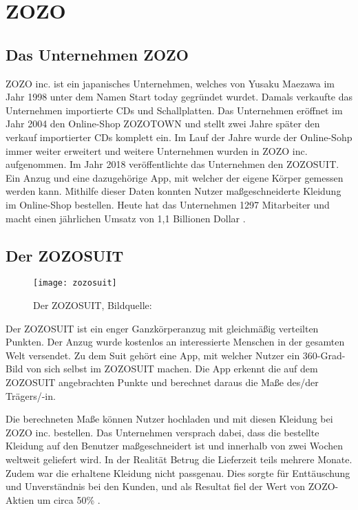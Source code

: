 \chapter{ZOZO}
\label{ch:zozosuit}

\section{Das Unternehmen ZOZO}
\label{sec:zozo}
ZOZO inc. ist ein japanisches Unternehmen, welches von Yusaku Maezawa im Jahr 1998 unter dem 
Namen \glqq{}Start today\grqq{} gegründet wurdet. Damals verkaufte das Unternehmen importierte 
CDs und Schallplatten. \newline
Das Unternehmen eröffnet im Jahr 2004 den Online-Shop ZOZOTOWN und stellt zwei Jahre später 
den verkauf importierter CDs komplett ein. \newline
Im Lauf der Jahre wurde der Online-Sohp immer weiter erweitert und weitere Unternehmen wurden in 
ZOZO inc. aufgenommen. \newline
Im Jahr 2018 veröffentlichte das Unternehmen den ZOZOSUIT. Ein Anzug und eine dazugehörige App, 
mit welcher der eigene Körper gemessen werden kann. Mithilfe dieser Daten konnten Nutzer 
maßgeschneiderte Kleidung im Online-Shop bestellen. \newline
Heute hat das Unternehmen 1297 Mitarbeiter und macht einen jährlichen Umsatz von 
1,1 Billionen Dollar \cite{misc:zozoforbes}.\cite{misc:zozohistory}

\pagebreak
\section{Der ZOZOSUIT}
\label{sec:zozosuit}

\begin{figure}[htpb]
    \centering
    \texttt{[image: zozosuit]}
    \caption{Der ZOZOSUIT, Bildquelle: \cite{misc:zozopic}}
    \label{img:zozosuit}
\end{figure}
Der ZOZOSUIT ist ein enger Ganzkörperanzug mit gleichmäßig verteilten Punkten. Der Anzug wurde 
kostenlos an interessierte Menschen in der gesamten Welt versendet. \newline
Zu dem Suit gehört eine App, mit welcher Nutzer ein 360-Grad-Bild von sich selbst im ZOZOSUIT machen. 
Die App erkennt die auf dem ZOZOSUIT angebrachten Punkte und berechnet daraus die Maße 
des/der Trägers/-in.

Die berechneten Maße können Nutzer hochladen und mit diesen Kleidung bei 
ZOZO inc. bestellen. Das Unternehmen versprach dabei, dass die bestellte Kleidung auf den Benutzer 
maßgeschneidert ist und innerhalb von zwei Wochen weltweit geliefert wird. \newline
In der Realität Betrug die Lieferzeit teils mehrere Monate. Zudem war die erhaltene Kleidung nicht passgenau. \newline
Dies sorgte für Enttäuschung und Unverständnis bei den Kunden, und als Resultat fiel der Wert von ZOZO-Aktien um circa 
50\% \cite{misc:zozoaktie}. \cite{misc:zozobad}

